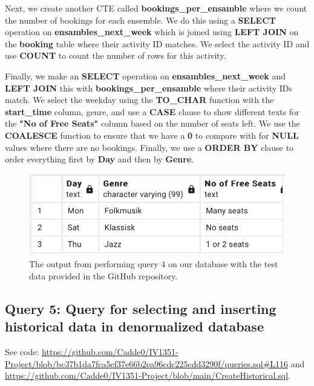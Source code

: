 \documentclass[a4paper]{scrartcl}
\begin{document}
Next, we create another CTE called \textbf{bookings\_per\_ensamble} where we count the number of bookings for each ensemble. We do this using a \textbf{SELECT} operation on \textbf{ensambles\_next\_week} which is joined using \textbf{LEFT JOIN} on the \textbf{booking} table where their activity ID matches. We select the activity ID and use \textbf{COUNT} to count the number of rows for this activity.

Finally, we make an \textbf{SELECT} operation on \textbf{ensambles\_next\_week} and \textbf{LEFT JOIN} this with \textbf{bookings\_per\_ensamble} where their activity IDs match. We select the weekday using the \textbf{TO\_CHAR} function with the \textbf{start\_time} column, genre, and use a \textbf{CASE} clause to show different texts for the \textbf{"No of Free Seats" } column based on the number of seats left. We use the \textbf{COALESCE} function to ensure that we have a \textbf{0} to compare with for \textbf{NULL} values where there are no bookings. Finally, we use a \textbf{ORDER BY} clause to order everything first by \textbf{Day} and then by \textbf{Genre}.



\begin{figure}[H]
    \begin{center}
      \includegraphics[scale=0.6]{query4_output.png}
      \caption{The output from performing query 4 on our database with the test data provided in the GitHub repository.}
      \label{fig:diag}
    \end{center}
  \end{figure}


\subsection{Query 5: Query for selecting and inserting historical data in denormalized database}
See code: \url{https://github.com/Cadde0/IV1351-Project/blob/bc37b1da7fca5ef37e66b2ea96cdc225cdd3290f/queries.sql#L116} and \url{https://github.com/Cadde0/IV1351-Project/blob/main/CreateHistorical.sql}.
\end{document}
